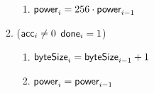 \begin{enumerate}
\begin{enumerate}
\begin{enumerate}
                    \item $\textsf{power}_{i}=256\cdot \textsf{power}_{i-1}$ 
                \end{enumerate}
            \item \If ($\textsf{acc}_{i} \neq 0$ \Or $\textsf{done}_{i}=1$) \Then 
                \begin{enumerate}
                    \item $\textsf{byteSize}_{i}=\textsf{byteSize}_{i-1} + 1$ 
                    \item $\textsf{power}_{i}=\textsf{power}_{i-1}$
                \end{enumerate}
        \end{enumerate}
\end{enumerate}
